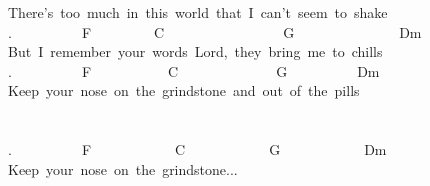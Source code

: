 {There's\ too\ much\ in\ this\ world\ that\ I\ can't\ seem\ to\ shake\\
.\ \ \ \ \ \ \ \ \ \ F\ \ \ \ \ \ \ \ \ C\ \ \ \ \ \ \ \ \ \ \ \ \ \ \ \ \ G\ \ \ \ \ \ \ \ \ \ \ \ \ \ \ Dm\\
But\ I\ remember\ your\ words\ Lord,\ they\ bring\ me\ to\ chills\\
.\ \ \ \ \ \ \ \ \ \ F\ \ \ \ \ \ \ \ \ \ \ C\ \ \ \ \ \ \ \ \ \ \ \ \ \ G\ \ \ \ \ \ \ \ \ \ Dm\\
Keep\ your\ nose\ on\ the\ grindstone\ and\ out\ of\ the\ pills\\
\\
\\
.\ \ \ \ \ \ \ \ \ \ F\ \ \ \ \ \ \ \ \ \ \ \ C\ \ \ \ \ \ \ \ \ \ \ \ G\ \ \ \ \ \ \ \ \ \ \ \ Dm\\
Keep\ your\ nose\ on\ the\ grindstone...}
